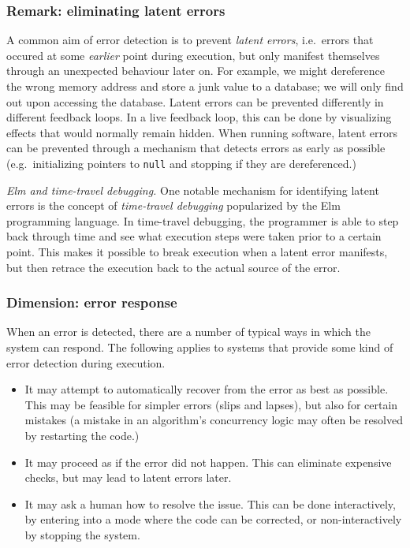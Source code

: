 \documentclass[english,submission]{programming}
\begin{document}
\hypertarget{remark-eliminating-latent-errors}{%
\subsubsection{Remark: eliminating latent
errors}\label{remark-eliminating-latent-errors}}

A common aim of error detection is to prevent \emph{latent errors},
i.e.~errors that occured at some \emph{earlier} point during execution,
but only manifest themselves through an unexpected behaviour later on.
For example, we might dereference the wrong memory address and store a
junk value to a database; we will only find out upon accessing the
database. Latent errors can be prevented differently in different
feedback loops. In a live feedback loop, this can be done by visualizing
effects that would normally remain hidden. When running software, latent
errors can be prevented through a mechanism that detects errors as early
as possible (e.g.~initializing pointers to \texttt{null} and stopping if
they are dereferenced.)

\emph{Elm and time-travel debugging.} One notable mechanism for
identifying latent errors is the concept of \emph{time-travel debugging}
popularized by the Elm programming language. In time-travel debugging,
the programmer is able to step back through time and see what execution
steps were taken prior to a certain point. This makes it possible to
break execution when a latent error manifests, but then retrace the
execution back to the actual source of the error.

\hypertarget{dimension-error-response}{%
\subsubsection{Dimension: error
response}\label{dimension-error-response}}

When an error is detected, there are a number of typical ways in which
the system can respond. The following applies to systems that provide
some kind of error detection during execution.

\begin{itemize}
\tightlist
\item
  It may attempt to automatically recover from the error as best as
  possible. This may be feasible for simpler errors (slips and lapses),
  but also for certain mistakes (a mistake in an algorithm's concurrency
  logic may often be resolved by restarting the code.)
\item
  It may proceed as if the error did not happen. This can eliminate
  expensive checks, but may lead to latent errors later.
\item
  It may ask a human how to resolve the issue. This can be done
  interactively, by entering into a mode where the code can be
  corrected, or non-interactively by stopping the system.
\end{itemize}
\end{document}
